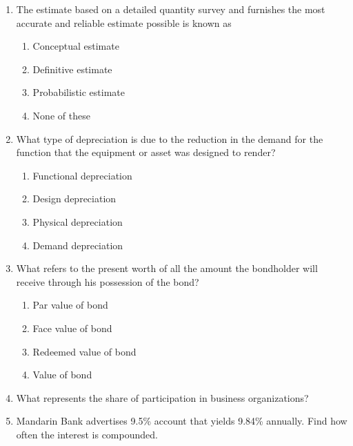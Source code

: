 \documentclass[11pt,a4paper]{article}
\begin{document}
\begin{enumerate}
\item{The estimate based on a detailed quantity survey and furnishes the most accurate and reliable estimate possible is known as}
\begin{enumerate}[label=\Alph*.]
\item{Conceptual estimate}
\item{Definitive estimate}
\item{Probabilistic estimate}
\item{None of these}
\end{enumerate}
\item{What type of depreciation is due to the reduction in the demand for the function that the equipment or asset was designed to render?}
\begin{enumerate}[label=\Alph*.]
\item{Functional depreciation}
\item{Design depreciation}
\item{Physical depreciation}
\item{Demand depreciation}
\end{enumerate}
\item{What refers to the present worth of all the amount the bondholder will receive through his possession of the bond?}
\begin{enumerate}[label=\Alph*.]
\item{Par value of bond}
\item{Face value of bond}
\item{Redeemed value of bond}
\item{Value of bond}
\end{enumerate}
\item{What represents the share of participation in business organizations?}
\\
\item{Mandarin Bank advertises 9.5\% account that yields 9.84\% annually. Find how often the interest is compounded.}
\\\begin{enumerate*}[itemjoin=\qquad, label=\Alph*.]

\end{enumerate*}
\end{enumerate}
\end{document}
